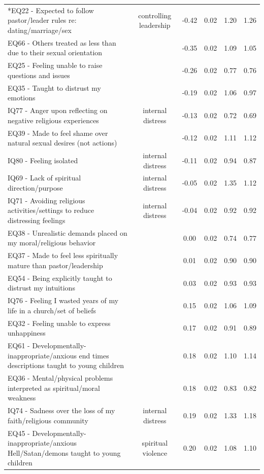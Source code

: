 \documentclass[
  letterpaper,
]{article}
\begin{document}
\begin{longtable}[t]{>{\raggedright\arraybackslash}p{11cm}ccccc}
\endfoot
\bottomrule
\endlastfoot
*EQ22 - Expected to follow pastor/leader rules re: dating/marriage/sex & controlling leadership & -0.42 & 0.02 & 1.20 & 1.26\\
EQ66 - Others treated as less than due to their sexual orientation &  & -0.35 & 0.02 & 1.09 & 1.05\\
EQ25 - Feeling unable to raise questions and issues &  & -0.26 & 0.02 & 0.77 & 0.76\\
EQ35 - Taught to distrust my emotions &  & -0.19 & 0.02 & 1.06 & 0.97\\
*IQ77 - Anger upon reflecting on negative religious experiences & internal distress & -0.13 & 0.02 & 0.72 & 0.69\\
\addlinespace
EQ39 - Made to feel shame over natural sexual desires (not actions) &  & -0.12 & 0.02 & 1.11 & 1.12\\
*IQ80 - Feeling isolated & internal distress & -0.11 & 0.02 & 0.94 & 0.87\\
*IQ69 - Lack of spiritual direction/purpose & internal distress & -0.05 & 0.02 & 1.35 & 1.12\\
*IQ71 - Avoiding religious activities/settings to reduce distressing feelings & internal distress & -0.04 & 0.02 & 0.92 & 0.92\\
EQ38 - Unrealistic demands placed on my moral/religious behavior &  & 0.00 & 0.02 & 0.74 & 0.77\\
\addlinespace
EQ37 - Made to feel less spiritually mature than pastor/leadership &  & 0.01 & 0.02 & 0.90 & 0.90\\
EQ54 - Being explicitly taught to distrust my intuitions &  & 0.03 & 0.02 & 0.93 & 0.93\\
IQ76 - Feeling I wasted years of my life in a church/set of beliefs &  & 0.15 & 0.02 & 1.06 & 1.09\\
EQ32 - Feeling unable to express unhappiness &  & 0.17 & 0.02 & 0.91 & 0.89\\
EQ61 - Developmentally-inappropriate/anxious end times descriptions taught to young children &  & 0.18 & 0.02 & 1.10 & 1.14\\
\addlinespace
EQ36 - Mental/physical problems interpreted as spiritual/moral weakness &  & 0.18 & 0.02 & 0.83 & 0.82\\
*IQ74 - Sadness over the loss of my faith/religious community & internal distress & 0.19 & 0.02 & 1.33 & 1.18\\
*EQ45 - Developmentally-inappropriate/anxious Hell/Satan/demons taught to young children & spiritual violence & 0.20 & 0.02 & 1.08 & 1.10\\

\end{longtable}
\end{document}
